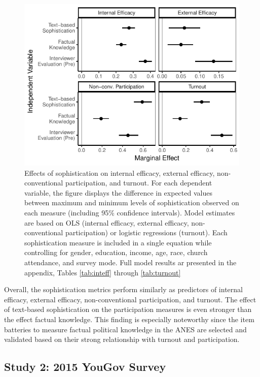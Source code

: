 \documentclass[12pt]{article}
\begin{document}
\begin{figure}[h]\centering
\includegraphics{../fig/knoweff_pres.pdf}
\caption{Effects of sophistication on internal efficacy, external efficacy, non-conventional participation, and turnout. For each dependent variable, the figure displays the difference in expected values between maximum and minimum levels of sophistication observed on each measure (including 95\% confidence intervals). Model estimates are based on OLS (internal efficacy, external efficacy, non-conventional participation) or logistic regressions (turnout). Each sophistication measure is included in a single equation while controlling for gender, education, income, age, race, church attendance, and survey mode. Full model results ar presented in the appendix, Tables \ref{tab:inteff} through \ref{tab:turnout}}\label{fig:knoweff}
\end{figure}

Overall, the sophistication metrics perform similarly as predictors of internal efficacy, external efficacy, non-conventional participation, and turnout. The effect of text-based sophistication on the participation measures is even stronger than the effect factual knowledge. This finding is especially noteworthy since the item batteries to measure factual political knowledge in the ANES are selected and validated based on their strong relationship with turnout and participation. 



\subsection*{Study 2: 2015 YouGov Survey}
\end{document}
